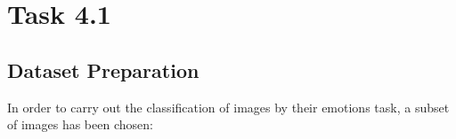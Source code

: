 \section{Task 4.1}
\subsection{Dataset Preparation}
In order to carry out the classification of images by their emotions task, a subset of images has been chosen: